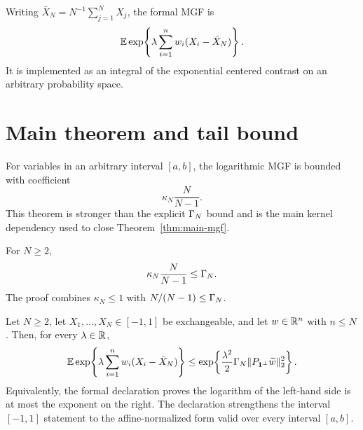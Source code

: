 \begin{definition}
\label{def:exchangeable-mgf}
\leanok
Writing $\bar X_N=N^{-1}\sum_{j=1}^N X_j$, the formal MGF is
\[
  \mathbb{E}\exp\!\left\{\lambda\sum_{i=1}^n w_i(X_i-\bar X_N)\right\}.
\]
It is implemented as an integral of the exponential centered contrast on an
arbitrary probability space.
\end{definition}

\section{Main theorem and tail bound}

\begin{theorem}
\label{thm:exact-mgf-certificate}
\leanok
For variables in an arbitrary interval $[a,b]$, the logarithmic MGF is bounded
with coefficient
\[
  \kappa_N\frac{N}{N-1}.
\]
This theorem is stronger than the explicit $\Gamma_N$ bound and is the main
kernel dependency used to close Theorem~\ref{thm:main-mgf}.
\end{theorem}

\begin{lemma}
\label{lem:coefficient-comparison}
\leanok
For $N\ge2$,
\[
  \kappa_N\frac{N}{N-1}\le \Gamma_N.
\]
The proof combines $\kappa_N\le1$ with $N/(N-1)\le\Gamma_N$.
\end{lemma}

\begin{theorem}
\label{thm:main-mgf}
\leanok
{}
Let $N\ge2$, let $X_1,\ldots,X_N\in[-1,1]$ be exchangeable, and let
$w\in\mathbb{R}^n$ with $n\le N$.  Then, for every $\lambda\in\mathbb{R}$,
\[
  \mathbb{E}\exp\!\left\{\lambda\sum_{i=1}^n w_i(X_i-\bar X_N)\right\}
  \le
  \exp\!\left\{
    \frac{\lambda^2}{2}\Gamma_N\|P_{\mathbf{1}^\perp}\widetilde w\|_2^2
  \right\}.
\]
Equivalently, the formal declaration proves the logarithm of the left-hand
side is at most the exponent on the right.  The declaration
 strengthens the interval $[-1,1]$ statement to
the affine-normalized form valid over every interval $[a,b]$.
\end{theorem}

